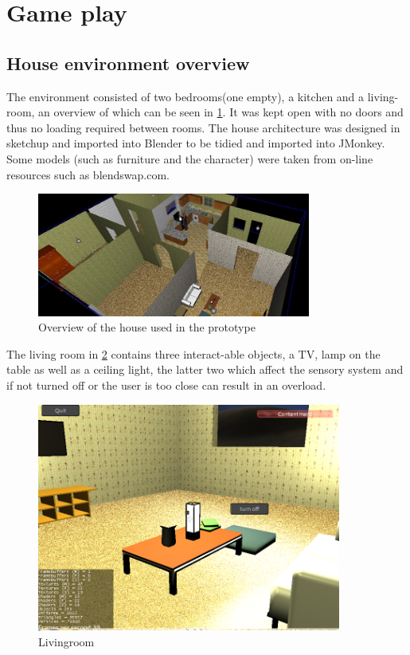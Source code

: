 \documentclass[11pt]{report}
\begin{document}
\section{Game play}

\subsection*{House environment overview}
The environment consisted of two bedrooms(one empty), a kitchen and a living-room, an overview of which can be seen in \ref{old_house}. It was kept open with no doors and thus no loading required between rooms. The house architecture was designed in sketchup and imported into Blender to be tidied and imported into JMonkey. Some models (such as furniture and the character) were taken from on-line resources such as blendswap.com.  

\begin{figure}[H]
\centering
\includegraphics[width=90mm]{images/prototype/old_fullhouse.jpg}
\caption{Overview of the house used in the prototype}
\label{old_house}
\end{figure}

The living room in \ref{prototype_livingroom} contains three interact-able objects, a TV, lamp on the table as well as a ceiling light, the latter two which affect the sensory system and if not turned off or the user is too close can result in an overload. 

\begin{figure}[H]
\centering
\includegraphics[width=100mm]{images/prototype/livingroom.png}
\caption{Livingroom}
\label{prototype_livingroom}
\end{figure}
\end{document}
